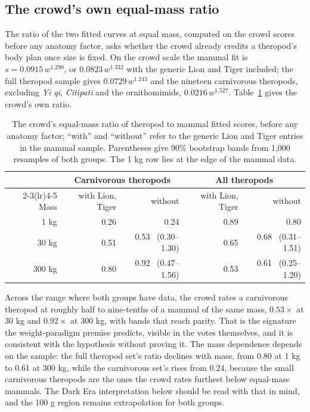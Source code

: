 \documentclass[11pt]{article}
\begin{document}
\subsection{The crowd's own equal-mass ratio}
\label{sec:equalmass}
The ratio of the two fitted curves at equal mass, computed on the crowd scores before any anatomy factor, asks whether the crowd already credits a theropod's body plan once size is fixed. On the crowd scale the mammal fit is $s=0.0915\,w^{1.290}$, or $0.0823\,w^{1.332}$ with the generic Lion and Tiger included; the full theropod sample gives $0.0729\,w^{1.243}$ and the nineteen carnivorous theropods, excluding \textit{Yi qi}, \textit{Citipati} and the ornithomimids, $0.0216\,w^{1.527}$. Table~\ref{tab:equalmass} gives the crowd's own ratio.

\begin{table}[H]
\centering
\small
\begin{tabular}{rrrrr}
\toprule
& \multicolumn{2}{c}{Carnivorous theropods} & \multicolumn{2}{c}{All theropods} \\
\cmidrule(lr){2-3}\cmidrule(lr){4-5}
Mass & with Lion, Tiger & without & with Lion, Tiger & without \\
\midrule
1 kg & 0.26 & 0.24 & 0.89 & 0.80 \\
30 kg & 0.51 & 0.53 \ (0.30--1.30) & 0.65 & 0.68 \ (0.31--1.51) \\
300 kg & 0.80 & 0.92 \ (0.47--1.56) & 0.53 & 0.61 \ (0.25--1.20) \\
\bottomrule
\end{tabular}
\caption{The crowd's equal-mass ratio of theropod to mammal fitted scores, before any anatomy factor; ``with'' and ``without'' refer to the generic Lion and Tiger entries in the mammal sample. Parentheses give 90\% bootstrap bands from 1,000 resamples of both groups. The 1 kg row lies at the edge of the mammal data.}
\label{tab:equalmass}
\end{table}

Across the range where both groups have data, the crowd rates a carnivorous theropod at roughly half to nine-tenths of a mammal of the same mass, $0.53\times$ at 30 kg and $0.92\times$ at 300 kg, with bands that reach parity. That is the signature the weight-paradigm premise predicts, visible in the votes themselves, and it is consistent with the hypothesis without proving it. The mass dependence depends on the sample: the full theropod set's ratio declines with mass, from 0.80 at 1 kg to 0.61 at 300 kg, while the carnivorous set's rises from 0.24, because the small carnivorous theropods are the ones the crowd rates furthest below equal-mass mammals. The Dark Era interpretation below should be read with that in mind, and the 100 g region remains extrapolation for both groups.
\end{document}
